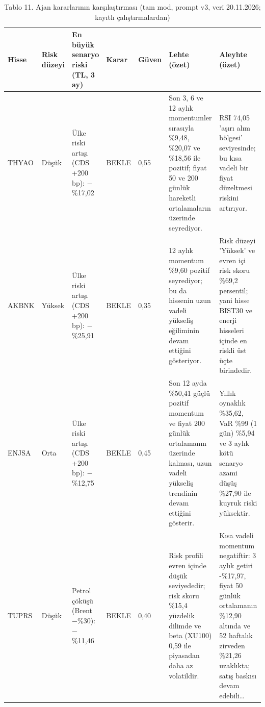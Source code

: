 \begin{table}
\caption{Tablo 11. Ajan kararlarının karşılaştırması (tam mod, prompt v3, veri 20.11.2026; kayıtlı çalıştırmalardan)}
\label{tab:tablo_11_ajan_karar_karsilastirmasi}
\begin{tabular}{lllllll}
\toprule
Hisse & Risk düzeyi & En büyük senaryo riski (TL, 3 ay) & Karar & Güven & Lehte (özet) & Aleyhte (özet) \\
\midrule
THYAO & Düşük & Ülke riski artışı (CDS +200 bp): −\%17,02 & BEKLE & 0,55 & Son 3, 6 ve 12 aylık momentumler sırasıyla \%9,48, \%20,07 ve \%18,56 ile pozitif; fiyat 50 ve 200 günlük hareketli ortalamaların üzerinde seyrediyor. & RSI 74,05 'aşırı alım bölgesi' seviyesinde; bu kısa vadeli bir fiyat düzeltmesi riskini artırıyor. \\
AKBNK & Yüksek & Ülke riski artışı (CDS +200 bp): −\%25,91 & BEKLE & 0,35 & 12 aylık momentum \%9,60 pozitif seyrediyor; bu da hissenin uzun vadeli yükseliş eğiliminin devam ettiğini gösteriyor. & Risk düzeyi 'Yüksek' ve evren içi risk skoru \%69,2 persentil; yani hisse BIST30 ve enerji hisseleri içinde en riskli üst üçte birindedir. \\
ENJSA & Orta & Ülke riski artışı (CDS +200 bp): −\%12,75 & BEKLE & 0,45 & Son 12 ayda \%50,41 güçlü pozitif momentum ve fiyat 200 günlük ortalamanın üzerinde kalması, uzun vadeli yükseliş trendinin devam ettiğini gösterir. & Yıllık oynaklık \%35,62, VaR \%99 (1 gün) \%5,94 ve 3 aylık kötü senaryo azami düşüş \%27,90 ile kuyruk riski yüksektir. \\
TUPRS & Düşük & Petrol çöküşü (Brent −\%30): −\%11,46 & BEKLE & 0,40 & Risk profili evren içinde düşük seviyededir; risk skoru \%15,4 yüzdelik dilimde ve beta (XU100) 0,59 ile piyasadan daha az volatildir. & Kısa vadeli momentum negatiftir: 3 aylık getiri -\%17,97, fiyat 50 günlük ortalamanın \%12,90 altında ve 52 haftalık zirveden \%21,26 uzaklıkta; satış baskısı devam edebili… \\
\bottomrule
\end{tabular}
\end{table}
